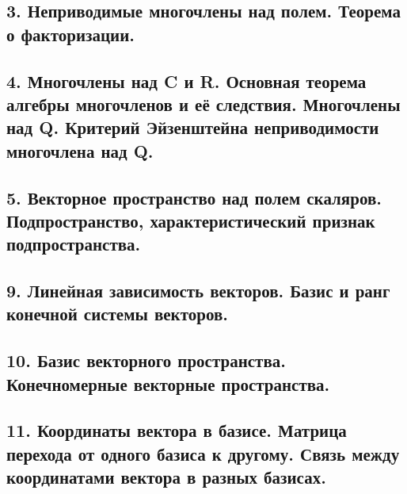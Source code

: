 \documentclass[11pt]{article}
\begin{document}
\subsection{3. Неприводимые многочлены над полем. Теорема о факторизации.}
\label{sec:org400287e}




\subsection{4. Многочлены над C и R. Основная теорема алгебры многочленов и её следствия. Многочлены над Q. Критерий Эйзенштейна неприводимости многочлена над Q.}
\label{sec:orgfcc45a8}




\subsection{5. Векторное пространство над полем скаляров. Подпространство, характеристический признак подпространства.}
\label{sec:orga02cdc6}




\subsection{9. Линейная зависимость векторов. Базис и ранг конечной системы векторов.}
\label{sec:orgd671623}




\subsection{10. Базис векторного пространства. Конечномерные векторные пространства.}
\label{sec:orgea1d1e7}




\subsection{11. Координаты вектора в базисе. Матрица перехода от одного базиса к другому. Связь между координатами вектора в разных базисах.}
\label{sec:org6c6694c}



\end{document}
